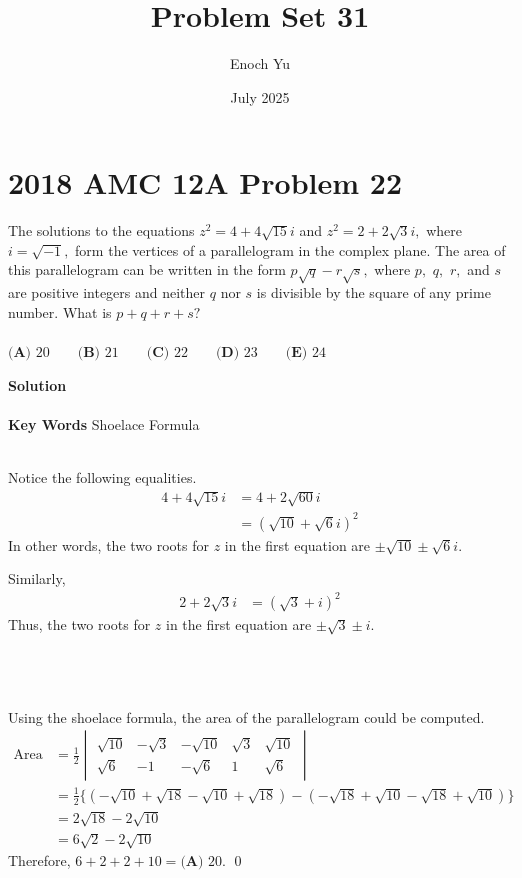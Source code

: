 \documentclass{article}
\title{Problem Set 31}
\author{Enoch Yu}
\date{July 2025}
\newenvironment{solution}{\begin{trivlist}\item[]{\bf Solution}}{\qed \end{trivlist}}
\begin{document}
\section*{2018 AMC 12A Problem 22}
The solutions to the equations $z^2=4+4\sqrt{15}i$ and $z^2=2+2\sqrt 3i,$ where $i=\sqrt{-1},$ form the vertices of a parallelogram in the complex plane. The area of this parallelogram can be written in the form $p\sqrt q-r\sqrt s,$ where $p,$ $q,$ $r,$ and $s$ are positive integers and neither $q$ nor $s$ is divisible by the square of any prime number. What is $p+q+r+s?$
\\\\
$\textbf{(A) } 20 \qquad  \textbf{(B) } 21 \qquad  \textbf{(C) } 22 \qquad  \textbf{(D) } 23 \qquad  \textbf{(E) } 24$
\begin{solution}
\\\\
\textbf{Key Words} Shoelace Formula
\\\\
\begin{minipage}[t]{0.5\textwidth}
Notice the following equalities.
\begin{align*}
    4 + 4\sqrt{15}i
    &= 4 + 2\sqrt{60}i \\
    &= \left( \sqrt{10} + \sqrt{6}i \right)^2
\end{align*}
In other words, the two roots for $z$ in the first equation are $\pm \sqrt{10} \pm \sqrt{6}i$.
\end{minipage}
\begin{minipage}[t]{0.5\textwidth}
Similarly,
\begin{align*}
    2 + 2\sqrt{3}i
    &= \left( \sqrt{3} + i \right)^2
\end{align*}
Thus, the two roots for $z$ in the first equation are $\pm \sqrt{3} \pm i$.
\end{minipage}
\\\\\\
Using the shoelace formula, the area of the parallelogram could be computed.
\begin{align*}
    \text{Area} &= \frac{1}{2}
    \begin{vmatrix}
        \sqrt{10} & -\sqrt{3} & -\sqrt{10} & \sqrt{3} & \sqrt{10} \\
        \sqrt{6} & -1 & -\sqrt{6} & 1 & \sqrt{6}
    \end{vmatrix} \\[0.5em]
    &= \frac{1}{2} \Big\{ \left( -\sqrt{10} + \sqrt{18} - \sqrt{10} + \sqrt{18} \right) - \left( -\sqrt{18} + \sqrt{10} - \sqrt{18} + \sqrt{10} \right) \Big\} \\[0.5em]
    &= 2\sqrt{18} - 2\sqrt{10} \\[0.5em]
    &= 6\sqrt{2} - 2\sqrt{10}
\end{align*}
Therefore, $6 + 2 + 2 + 10 = \boxed{\textbf{(A) } 20}$.
\end{solution}
\end{document}
